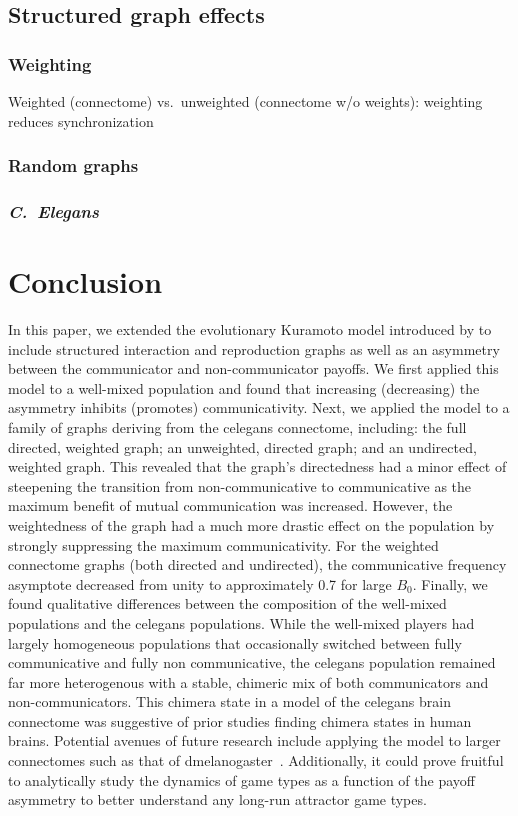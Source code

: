 \documentclass[pdflatex,lineno,referee,sn-mathphys-ay]{sn-jnl}
\begin{document}

\subsection{Structured graph effects}
\subsubsection{Weighting}
Weighted (connectome) vs.\ unweighted (connectome w/o
  weights): weighting reduces synchronization
\subsubsection{Random graphs}
\subsubsection{\emph{C.\ Elegans}}

\section{Conclusion}
In this paper, we extended the evolutionary Kuramoto model
introduced by \citet{tripp2022evolutionary}
to include structured interaction and reproduction graphs
as well as an asymmetry between
the communicator and non-communicator payoffs.
We first applied this model to a well-mixed population
and found that increasing (decreasing) the asymmetry
inhibits (promotes) communicativity.
Next, we applied the model to
a family of graphs deriving from the \gls{celegans} connectome,
including: the full directed, weighted graph;
an unweighted, directed graph;
and an undirected, weighted graph.
This revealed that the graph's directedness
had a minor effect of steepening the transition
from non-communicative to communicative
as the maximum benefit of mutual communication was increased.
However, the weightedness of the graph had a much more drastic effect
on the population by strongly suppressing the maximum communicativity.
For the weighted connectome graphs (both directed and undirected),
the communicative frequency asymptote decreased from unity
to approximately \num{0.7} for large $B_0$.
Finally, we found qualitative differences between the composition
of the well-mixed populations and the \gls{celegans} populations.
While the well-mixed players had largely homogeneous populations
that occasionally switched between fully communicative
and fully non communicative,
the \gls{celegans} population remained far more heterogenous
with a stable, chimeric mix of both communicators and non-communicators.
This chimera state in a model of the \gls{celegans} brain connectome
was suggestive of prior studies finding chimera states in human brains.
Potential avenues of future research include applying the model
to larger connectomes such as that
of \gls{dmelanogaster}~\citep{schlegel2024whole}.
Additionally, it could prove fruitful to analytically study
the dynamics of game types as a function of the payoff asymmetry
to better understand any long-run attractor game types.
\end{document}
